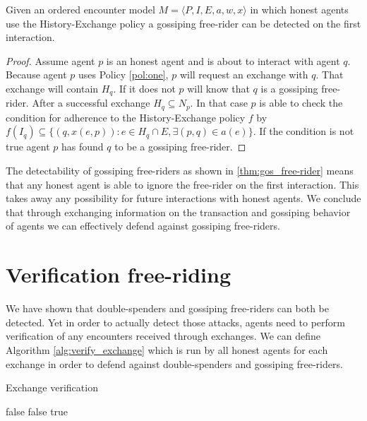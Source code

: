 \begin{thm}
    \label{thm:gos_free-rider}
    Given an ordered encounter model $M = \langle P, I, E, a, w, x \rangle$ in which honest agents use the History-Exchange policy
    a gossiping free-rider can be detected on the first interaction.
\end{thm}
\begin{proof}
    Assume agent $p$ is an honest agent and is about to interact with agent $q$. Because agent $p$
    uses Policy \ref{pol:one}, $p$ will request an exchange with $q$. That exchange will contain 
    $H_q$. If it does not $p$ will know that $q$ is a gossiping free-rider. After a successful
    exchange $H_q \subseteq N_p$. In that case $p$ is able to check the condition for adherence to 
    the History-Exchange policy $f$ by $f(I_q) \subseteq \{ (q, x(e, p)) : e \in 
    H_q \cap E, \exists (p, q) \in a(e)\}$. If the condition is not true agent $p$ has found $q$ to be a
    gossiping free-rider.
\end{proof}

The detectability of gossiping free-riders as shown in \ref{thm:gos_free-rider} means that any 
honest agent is able to ignore the free-rider on the first interaction. This takes away any 
possibility for future interactions with honest agents. We conclude that through exchanging
information on the transaction and gossiping behavior of agents we can effectively defend against 
gossiping free-riders.

\section{Verification free-riding}
\label{sec:verification_free-riding}
We have shown that double-spenders and gossiping free-riders can both be detected. Yet in order to 
actually detect those attacks, agents need to perform verification of any encounters received 
through exchanges. We can define Algorithm \ref{alg:verify_exchange} which is run by all 
honest agents for each exchange in order to defend against double-spenders and gossiping free-riders.

\begin{algorithm}
\caption{Exchange verification}\label{alg:verify_exchange}
\begin{algorithmic}[1]
 \Return false
\EndIf
\EndFor
{}
 \Return false
\EndIf
\EndFor
\Return true
\EndProcedure
\end{algorithmic}
\end{algorithm}

